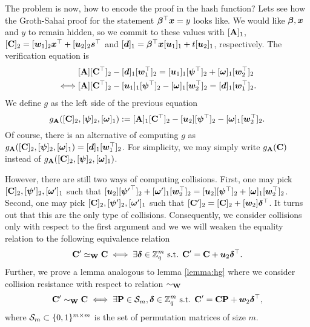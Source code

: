 The problem is now, how to encode the proof in the hash function? Lets see how the Groth-Sahai proof for the statement ${\boldsymbol{\beta}}^\top{\boldsymbol{x}} = y$ looks like. We would like ${\boldsymbol{\beta}},{\boldsymbol{x}}$ and $y$ to remain hidden, so we commit to these values with $[\mathbf{{A}}]_1$, $[\mathbf{{C}}]_2 = [{\boldsymbol{w}}_1]_2{\boldsymbol{x}}^\top+[{\boldsymbol{u}}_2]_2{\boldsymbol{s}}^\top$ and $[{\boldsymbol{d}}]_1 = {\boldsymbol{\beta}}^\top{\boldsymbol{x}}[{\boldsymbol{u}}_1]_1+t[{\boldsymbol{u}}_2]_1$, respectively. The verification equation is
\begin{align}
&[\mathbf{{A}}][\mathbf{{C}}^\top]_2-[{\boldsymbol{d}}]_1[{\boldsymbol{w}}_1^\top]_2 = [{\boldsymbol{u}}_1]_1[{\boldsymbol{\psi}}^\top]_2+[{\boldsymbol{\omega}}]_1[{\boldsymbol{w}}_2^\top]_2 \label{eq:ver-betax=y}\\
\iff & [\mathbf{{A}}][\mathbf{{C}}^\top]_2 - [{\boldsymbol{u}}_1]_1[{\boldsymbol{\psi}}^\top]_2 - [{\boldsymbol{\omega}}]_1[{\boldsymbol{w}}_2^\top]_2 = [{\boldsymbol{d}}]_1[{\boldsymbol{w}}_1^\top]_2. \nonumber
\end{align}
We define $g$ as the left side of the previous equation
$$
g_{\mathbf{{A}}}([\mathbf{{C}}]_2,[{\boldsymbol{\psi}}]_2,[{\boldsymbol{\omega}}]_1):= [\mathbf{{A}}]_1[\mathbf{{C}}^\top]_2-[{\boldsymbol{u}}_2][{\boldsymbol{\psi}}^\top]_2-[{\boldsymbol{\omega}}]_1[{\boldsymbol{w}}_2^\top]_2.
$$
Of course, there is an alternative of computing $g$ as $g_{\mathbf{{A}}}([\mathbf{{C}}]_2,[{\boldsymbol{\psi}}]_2,[{\boldsymbol{\omega}}]_1)=[{\boldsymbol{d}}]_1[{\boldsymbol{w}}_1^\top]_2$. For simplicity, we may simply write $g_{\mathbf{{A}}}(\mathbf{{C}})$ instead of $g_{\mathbf{{A}}}([\mathbf{{C}}]_2,[{\boldsymbol{\psi}}]_2,[{\boldsymbol{\omega}}]_1)$.

However, there are still two ways of computing collisions. First, one may pick $[\mathbf{{C}}]_2,\allowbreak[{\boldsymbol{\psi}}']_2,[{\boldsymbol{\omega}}']_1$ such that $[{\boldsymbol{u}}_2][{{\boldsymbol{\psi}}'}^\top]_2+[{\boldsymbol{\omega}}']_1[{\boldsymbol{w}}_2^\top]_2=[{\boldsymbol{u}}_2][{\boldsymbol{\psi}}^\top]_2+[{\boldsymbol{\omega}}]_1[{\boldsymbol{w}}_2^\top]_2$. Second, one may pick $[\mathbf{{C}}]_2,[{\boldsymbol{\psi}}']_2,[{\boldsymbol{\omega}}']_1$ such that $[\mathbf{{C}}']_2 = [\mathbf{{C}}]_2 + [{\boldsymbol{w}}_2]{\boldsymbol{\delta}}^\top$. It turns out that this are the only type of collisions. Consequently, we consider collisions only with respect to the first argument and we we will weaken the equality relation to the following equivalence relation
$$
\mathbf{{C}}'\simeq_{\mathbf{{W}}} \mathbf{{C}} \iff \exists {\boldsymbol{\delta}}\in\mathbb{Z}_q^m \text{ s.t. } \mathbf{{C}}' = \mathbf{{C}}+{\boldsymbol{u}}_2{\boldsymbol{\delta}}^\top.
$$
Further, we prove a lemma analogous to lemma \ref{lemma:hg} where we consider collision resistance with respect to relation $\sim_{\mathbf{{W}}}$ 
$$
\mathbf{{C}}'\sim_{\mathbf{{W}}} \mathbf{{C}} \iff \exists \mathbf{{P}}\in\mathcal{S}_m, {\boldsymbol{\delta}}\in\mathbb{Z}_q^m \text{ s.t. } \mathbf{{C}}' = \mathbf{{C}}\mathbf{{P}}+{\boldsymbol{w}}_2{\boldsymbol{\delta}}^\top,
$$
where $\mathcal{S}_m\subset\{0,1\}^{m\times m}$ is the set of permutation matrices of size $m$.

